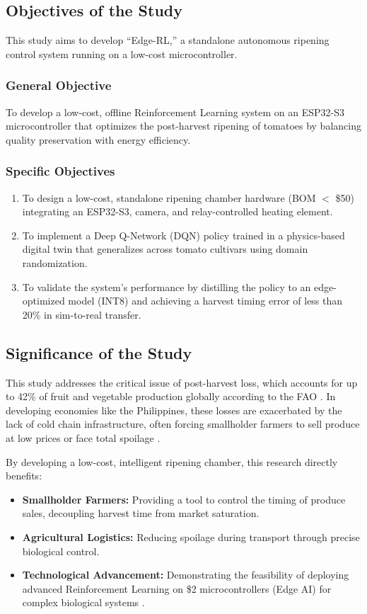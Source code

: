 \documentclass[conference]{IEEEtran}
\begin{document}
\subsection{Objectives of the Study}
This study aims to develop ``Edge-RL,'' a standalone autonomous ripening control system running on a low-cost microcontroller.

\subsubsection{General Objective}
To develop a low-cost, offline Reinforcement Learning system on an ESP32-S3 microcontroller that optimizes the post-harvest ripening of tomatoes by balancing quality preservation with energy efficiency.

\subsubsection{Specific Objectives}
\begin{enumerate}
    \item To design a low-cost, standalone ripening chamber hardware (BOM $<$ \$50) integrating an ESP32-S3, camera, and relay-controlled heating element.
    \item To implement a Deep Q-Network (DQN) policy trained in a physics-based digital twin that generalizes across tomato cultivars using domain randomization.
    \item To validate the system's performance by distilling the policy to an edge-optimized model (INT8) and achieving a harvest timing error of less than 20\% in sim-to-real transfer.
\end{enumerate}

\subsection{Significance of the Study}

This study addresses the critical issue of post-harvest loss, which accounts for up to 42\% of fruit and vegetable production globally according to the FAO \cite{fao2019}. In developing economies like the Philippines, these losses are exacerbated by the lack of cold chain infrastructure, often forcing smallholder farmers to sell produce at low prices or face total spoilage \cite{worldbank2020}.

By developing a low-cost, intelligent ripening chamber, this research directly benefits:
\begin{itemize}
    \item \textbf{Smallholder Farmers:} Providing a tool to control the timing of produce sales, decoupling harvest time from market saturation.
    \item \textbf{Agricultural Logistics:} Reducing spoilage during transport \cite{kader2005} through precise biological control.
    \item \textbf{Technological Advancement:} Demonstrating the feasibility of deploying advanced Reinforcement Learning on \$2 microcontrollers (Edge AI) for complex biological systems \cite{warden2019tinyml}.
\end{itemize}
\end{document}
